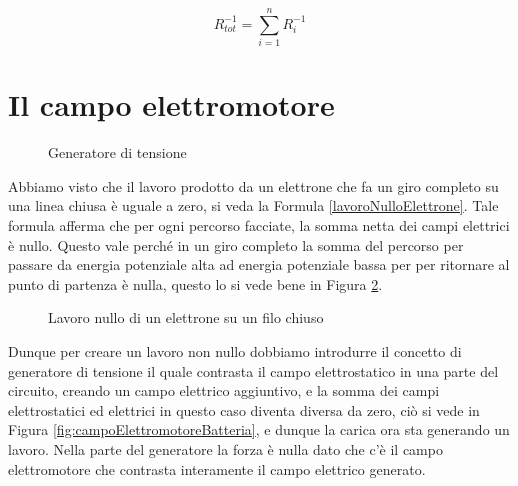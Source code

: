 \begin{equation}
    R_{tot}^{-1} = \sum_{i=1}^n R_i^{-1}
\end{equation}

\section{Il campo elettromotore }

\begin{figure}[H]
    \centering
    \caption{Generatore di tensione}
    \label{fig:generatoreTensione}
\end{figure}

Abbiamo visto che il lavoro prodotto da un elettrone che fa un giro completo su una linea chiusa è uguale a zero, si veda la Formula \ref{lavoroNulloElettrone}. Tale formula afferma che per ogni percorso facciate, la somma netta dei campi elettrici è nullo. Questo vale perché in un giro completo la somma del percorso per passare da energia potenziale alta ad energia potenziale bassa per per ritornare al punto di partenza è nulla, questo lo si vede bene in Figura \ref{fig:lavoroNUlloElettroneFiloCHiuso}. %

\begin{figure}[H]
    \centering
    \caption{Lavoro nullo di un elettrone su un filo chiuso}
    \label{fig:lavoroNUlloElettroneFiloCHiuso}
\end{figure}


Dunque per creare un lavoro non nullo dobbiamo introdurre il concetto di generatore di tensione il quale contrasta il campo elettrostatico in una parte del circuito, creando un campo elettrico aggiuntivo, e la somma dei campi elettrostatici ed elettrici in questo caso diventa diversa da zero, ciò si vede in Figura \ref{fig:campoElettromotoreBatteria}, e dunque la carica ora sta generando un lavoro.
Nella parte del generatore la forza è nulla dato che c'è il campo elettromotore che contrasta interamente il campo elettrico generato.

